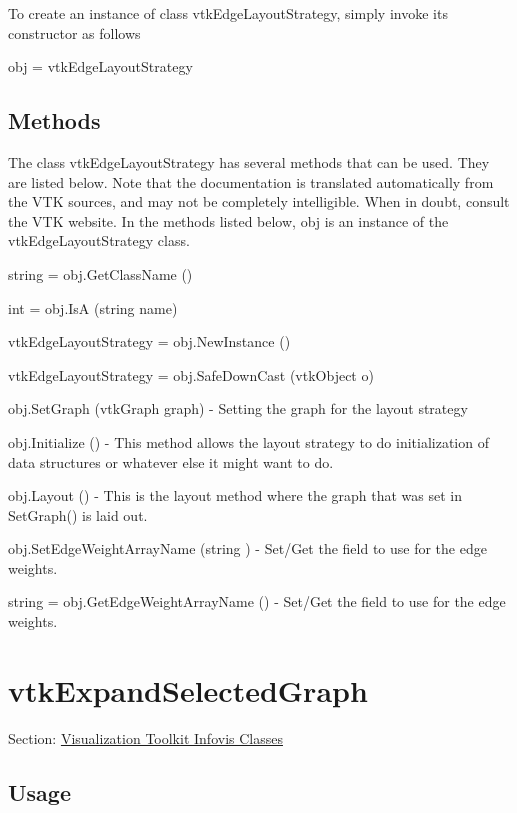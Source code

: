 To create an instance of class vtk\-Edge\-Layout\-Strategy, simply invoke its constructor as follows \begin{DoxyVerb}  obj = vtkEdgeLayoutStrategy
\end{DoxyVerb}
 \hypertarget{vtkwidgets_vtkxyplotwidget_Methods}{}\subsection{Methods}\label{vtkwidgets_vtkxyplotwidget_Methods}
The class vtk\-Edge\-Layout\-Strategy has several methods that can be used. They are listed below. Note that the documentation is translated automatically from the V\-T\-K sources, and may not be completely intelligible. When in doubt, consult the V\-T\-K website. In the methods listed below, {\ttfamily obj} is an instance of the vtk\-Edge\-Layout\-Strategy class. 
\begin{DoxyItemize}
\item {\ttfamily string = obj.\-Get\-Class\-Name ()}  
\item {\ttfamily int = obj.\-Is\-A (string name)}  
\item {\ttfamily vtk\-Edge\-Layout\-Strategy = obj.\-New\-Instance ()}  
\item {\ttfamily vtk\-Edge\-Layout\-Strategy = obj.\-Safe\-Down\-Cast (vtk\-Object o)}  
\item {\ttfamily obj.\-Set\-Graph (vtk\-Graph graph)} -\/ Setting the graph for the layout strategy  
\item {\ttfamily obj.\-Initialize ()} -\/ This method allows the layout strategy to do initialization of data structures or whatever else it might want to do.  
\item {\ttfamily obj.\-Layout ()} -\/ This is the layout method where the graph that was set in Set\-Graph() is laid out.  
\item {\ttfamily obj.\-Set\-Edge\-Weight\-Array\-Name (string )} -\/ Set/\-Get the field to use for the edge weights.  
\item {\ttfamily string = obj.\-Get\-Edge\-Weight\-Array\-Name ()} -\/ Set/\-Get the field to use for the edge weights.  
\end{DoxyItemize}\hypertarget{vtkinfovis_vtkexpandselectedgraph}{}\section{vtk\-Expand\-Selected\-Graph}\label{vtkinfovis_vtkexpandselectedgraph}
Section\-: \hyperlink{sec_vtkinfovis}{Visualization Toolkit Infovis Classes} \hypertarget{vtkwidgets_vtkxyplotwidget_Usage}{}\subsection{Usage}\label{vtkwidgets_vtkxyplotwidget_Usage}
